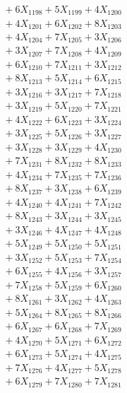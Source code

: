 \documentclass[a4paper,10pt]{article}
\begin{document}
{\begin{align}
&\;  + 6 X_{1198} + 5 X_{1199} + 4 X_{1200} \\[0.3ex]
&\;  + 4 X_{1201} + 6 X_{1202} + 8 X_{1203} \\[0.3ex]
&\;  + 4 X_{1204} + 7 X_{1205} + 3 X_{1206} \\[0.3ex]
&\;  + 3 X_{1207} + 7 X_{1208} + 4 X_{1209} \\[0.5ex]\allowbreak
&\;  + 6 X_{1210} + 7 X_{1211} + 3 X_{1212} \\[0.3ex]
&\;  + 8 X_{1213} + 5 X_{1214} + 6 X_{1215} \\[0.3ex]
&\;  + 3 X_{1216} + 3 X_{1217} + 7 X_{1218} \\[0.3ex]
&\;  + 3 X_{1219} + 5 X_{1220} + 7 X_{1221} \\[0.3ex]
&\;  + 4 X_{1222} + 6 X_{1223} + 3 X_{1224} \\[0.3ex]
&\;  + 3 X_{1225} + 5 X_{1226} + 3 X_{1227} \\[0.3ex]
&\;  + 3 X_{1228} + 3 X_{1229} + 4 X_{1230} \\[0.3ex]
&\;  + 7 X_{1231} + 8 X_{1232} + 8 X_{1233} \\[0.3ex]
&\;  + 4 X_{1234} + 7 X_{1235} + 7 X_{1236} \\[0.3ex]
&\;  + 8 X_{1237} + 3 X_{1238} + 6 X_{1239} \\[0.5ex]\allowbreak
&\;  + 4 X_{1240} + 4 X_{1241} + 7 X_{1242} \\[0.3ex]
&\;  + 8 X_{1243} + 3 X_{1244} + 3 X_{1245} \\[0.3ex]
&\;  + 3 X_{1246} + 4 X_{1247} + 4 X_{1248} \\[0.3ex]
&\;  + 5 X_{1249} + 5 X_{1250} + 5 X_{1251} \\[0.3ex]
&\;  + 3 X_{1252} + 5 X_{1253} + 7 X_{1254} \\[0.3ex]
&\;  + 6 X_{1255} + 4 X_{1256} + 3 X_{1257} \\[0.3ex]
&\;  + 7 X_{1258} + 5 X_{1259} + 6 X_{1260} \\[0.3ex]
&\;  + 8 X_{1261} + 3 X_{1262} + 4 X_{1263} \\[0.3ex]
&\;  + 5 X_{1264} + 8 X_{1265} + 8 X_{1266} \\[0.3ex]
&\;  + 6 X_{1267} + 6 X_{1268} + 7 X_{1269} \\[0.5ex]\allowbreak
&\;  + 4 X_{1270} + 5 X_{1271} + 6 X_{1272} \\[0.3ex]
&\;  + 6 X_{1273} + 5 X_{1274} + 4 X_{1275} \\[0.3ex]
&\;  + 7 X_{1276} + 4 X_{1277} + 5 X_{1278} \\[0.3ex]
&\;  + 6 X_{1279} + 7 X_{1280} + 7 X_{1281} \\[0.3ex]

\end{align}}
\end{document}
